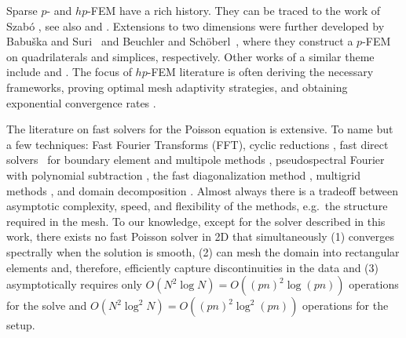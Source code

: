 \documentclass[hidelinks,onefignum,onetabnum]{siamart220329}
\begin{document}
\bigskip

Sparse $p$- and $hp$-FEM have a rich history. They can be traced to the work of Szab\'o \cite{szabo1979}, see also \cite[Ch.~2.5.2]{szabo2011introduction} and \cite[Ch.~3.1]{Schwab1998}. Extensions to two dimensions were further developed by Babu{\v{s}}ka and Suri~\cite{babuvska1991efficient} and Beuchler and Sch\"oberl~\cite{Beuchler2006}, where they construct a $p$-FEM on quadrilaterals and simplices, respectively. Other works of a similar theme include \cite{babuvska1994p, pavarino1993, Beuchler2007, Beuchler2012, Jia2022, Beuchler2012b, Dubiner1991, Karniadakis2005, Schwab1998} and \cite[App.~A]{Snowball2020}. The focus of $hp$-FEM literature is often deriving the necessary frameworks, proving optimal mesh adaptivity strategies, and obtaining exponential convergence rates \cite{Schwab1998, houston2002}.

The literature on fast solvers for the Poisson equation is  extensive.  To name but a few techniques: Fast Fourier Transforms (FFT), cyclic reductions \cite{Buzbee1970}, fast direct solvers%
%
\, for boundary element and multipole methods  \cite{Mckenney1995, Martinsson2019}, pseudospectral Fourier with polynomial subtraction \cite{Averbuch1998, Braverman1998}, the fast diagonalization method \cite{Lynch1964}, multigrid methods \cite{Brubeck2022, Gholami2016, Huismann2019, Lottes2005,schoberl2008}, and domain decomposition \cite{gillman2014direct, gillman2012direct, martinsson2009fast}. Almost always there is a tradeoff between asymptotic complexity, speed, and flexibility of the methods, e.g.~the structure required in the mesh. To our knowledge, except for the solver described in this work, there exists no fast Poisson solver in 2D that simultaneously (1) converges spectrally when the solution is smooth, (2) can mesh the domain into rectangular elements and, therefore, efficiently capture discontinuities in the data and (3) asymptotically requires only $O(N^2 \log N) = O( (pn)^2 \log (pn))$ operations for the solve and $O(N^2 \log^2 N) = O( (pn)^2 \log^2 (pn))$ operations for the setup.
\end{document}
